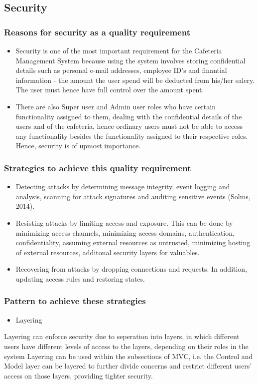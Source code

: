 \documentclass[a4paper,12pt]{article}
\begin{document}
\subsection{Security}

\subsubsection{Reasons for security as a quality requirement}
 \begin{itemize}
 \item Security is one of the most important requirement for the Cafeteria Management System because using the system involves storing confidential details such as personal e-mail addresses, employee ID's and finantial information - the amount the user spend will be deducted from his/her salery. The user must hence have full control over the amount spent.  
\item There are also Super user and Admin user roles who have certain functionality assigned to them, dealing with the confidential details of the users and of the cafeteria, hence ordinary users must not be able to access any functionality besides the functionality assigned to their respective roles. Hence, security is of upmost importance.
 \end{itemize}

 \subsubsection{Strategies to achieve this quality requirement}
 \begin{itemize}
 \item Detecting attacks by determining message integrity, event logging and analysis, scanning for attack signatures and auditing sensitive events (Solms, 2014).
\item Resisting attacks by limiting access and exposure. This can be done by minimizing access channels, minimizing access domains, authentication, confidentiality, assuming external resources as untrusted, minimizing hosting of external resources, additonal security layers for valuables.
\item Recovering from attacks by dropping connections and requests. In addition, updating access rules and restoring states.
 \end{itemize}

\subsubsection{Pattern to achieve these strategies}
\begin{itemize}
 \item Layering
\end{itemize}
Layering can enforce security due to seperation into layers, in which different users have different levels of access to the layers, depending on their roles in the system
Layering can be used within the subsections of MVC, i.e. the Control and Model layer can be layered to further divide concerns and restrict different users' access on those layers, providing tighter security.
\end{document}

